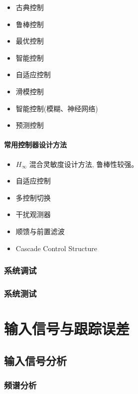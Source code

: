 \documentclass[14pt,a4paper]{article}
\theoremstyle{plain}
\theoremstyle{definition}
\theoremstyle{remark}
\theoremstyle{plain}
\theoremstyle{plain}
\theoremstyle{definition}
\begin{document}
					\begin{itemize}
						\item 古典控制
						\item 鲁棒控制
						\item 最优控制
						\item 智能控制
						\item 自适应控制
						\item 滑模控制
						\item 智能控制(模糊、神经网络)
						\item 预测控制
					\end{itemize}
			
				\paragraph{常用控制器设计方法}%
				\label{par:常用控制器设计方法}
				
				\begin{itemize}
					\item $H_\infty$ 混合灵敏度设计方法, 鲁棒性较强。 
					\item 自适应控制
					\item 多控制切换 
					\item 干扰观测器 
					\item 顺馈与前置滤波 
					\item Cascade Control Structure 
				\end{itemize}
			\subsubsection{系统调试}%
			\label{ssub:系统调试}
			
				
			\subsubsection{系统测试}%
			\label{ssub:系统测试}
			
		
	\newpage
	\section{输入信号与跟踪误差}%
	\label{sec:输入信号与跟踪误差}

		\subsection{输入信号分析}%
		\label{sub:输入信号分析}

			\subsubsection*{频谱分析}%
			
\end{document}
